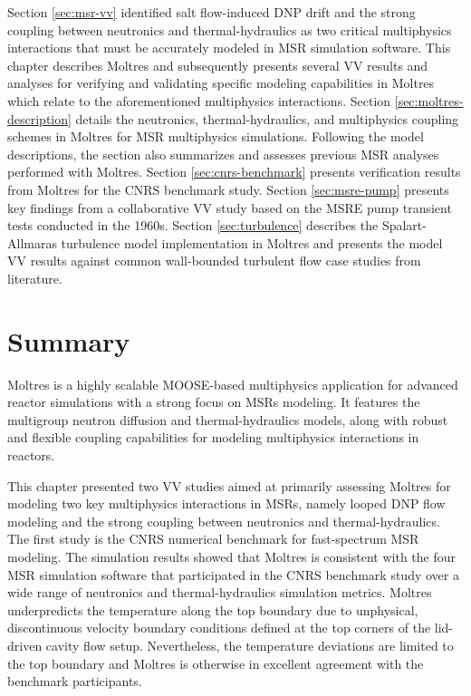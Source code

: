 Section \ref{sec:msr-vv} identified salt flow-induced \gls{DNP} drift and the strong coupling
between neutronics and thermal-hydraulics as two critical multiphysics interactions that must be
accurately modeled in \gls{MSR} simulation software. This chapter describes Moltres and
subsequently presents several \gls{VV} results and analyses for verifying and validating specific
modeling capabilities in Moltres which relate to the aforementioned multiphysics interactions.
Section \ref{sec:moltres-description} details the neutronics, thermal-hydraulics, and multiphysics
coupling schemes in Moltres for \gls{MSR} multiphysics simulations. Following the model
descriptions, the section also summarizes and assesses previous \gls{MSR} analyses
performed with Moltres. Section \ref{sec:cnrs-benchmark} presents verification results from Moltres
for the CNRS benchmark study. Section \ref{sec:msre-pump} presents key findings from a
collaborative \gls{VV} study based on the \gls{MSRE} pump transient tests conducted in the 1960s.
Section \ref{sec:turbulence} describes the Spalart-Allmaras turbulence model implementation in
Moltres and presents the model \gls{VV} results against common wall-bounded turbulent flow case
studies from literature.








\FloatBarrier

\section{Summary}

Moltres is a highly scalable \gls{MOOSE}-based multiphysics application for advanced reactor
simulations with a strong focus on \glspl{MSR} modeling. It features the multigroup neutron
diffusion and thermal-hydraulics models, along with robust and flexible coupling capabilities for
modeling multiphysics interactions in reactors.

This chapter presented two \gls{VV} studies aimed at primarily assessing Moltres for modeling
two key multiphysics interactions in \glspl{MSR}, namely looped \gls{DNP} flow modeling and the
strong coupling between neutronics and thermal-hydraulics. The first study is the CNRS numerical
benchmark for fast-spectrum \gls{MSR} modeling. The simulation results showed that Moltres is
consistent with the four \gls{MSR} simulation software that participated in the CNRS benchmark
study \cite{tiberga_results_2020} over a wide range of neutronics and thermal-hydraulics simulation
metrics. Moltres underpredicts the temperature along the top boundary due to unphysical,
discontinuous velocity boundary conditions defined at the top corners of the lid-driven cavity
flow setup. Nevertheless, the temperature deviations are limited to the top boundary and Moltres
is otherwise in excellent agreement with the benchmark participants.

